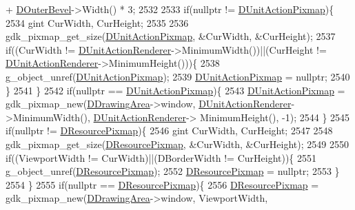 \begin{DoxyCode}
{       + \hyperlink{classCApplicationData_abc2b04aa05148da81145ff6d6bc2bf01}{DOuterBevel}->Width() * 3;
2532     
2533     \textcolor{keywordflow}{if}(\textcolor{keyword}{nullptr} != \hyperlink{classCApplicationData_ae264356c833cd581093e3b373cce6620}{DUnitActionPixmap})\{
2534         gint CurWidth, CurHeight;
2535         
2536         gdk\_pixmap\_get\_size(\hyperlink{classCApplicationData_ae264356c833cd581093e3b373cce6620}{DUnitActionPixmap}, &CurWidth, &CurHeight);
2537         \textcolor{keywordflow}{if}((CurWidth != \hyperlink{classCApplicationData_a5aca1f832dd6387662f0d4441745cf6f}{DUnitActionRenderer}->MinimumWidth())||(CurHeight != 
      \hyperlink{classCApplicationData_a5aca1f832dd6387662f0d4441745cf6f}{DUnitActionRenderer}->MinimumHeight()))\{
2538             g\_object\_unref(\hyperlink{classCApplicationData_ae264356c833cd581093e3b373cce6620}{DUnitActionPixmap});
2539             \hyperlink{classCApplicationData_ae264356c833cd581093e3b373cce6620}{DUnitActionPixmap} = \textcolor{keyword}{nullptr};
2540         \}
2541     \}
2542     \textcolor{keywordflow}{if}(\textcolor{keyword}{nullptr} == \hyperlink{classCApplicationData_ae264356c833cd581093e3b373cce6620}{DUnitActionPixmap})\{
2543         \hyperlink{classCApplicationData_ae264356c833cd581093e3b373cce6620}{DUnitActionPixmap} = gdk\_pixmap\_new(\hyperlink{classCApplicationData_a4735f5d31632313e0b2a1659eb178987}{DDrawingArea}->window, 
      \hyperlink{classCApplicationData_a5aca1f832dd6387662f0d4441745cf6f}{DUnitActionRenderer}->MinimumWidth(), \hyperlink{classCApplicationData_a5aca1f832dd6387662f0d4441745cf6f}{DUnitActionRenderer}->
      MinimumHeight(), -1);
2544     \}
2545     \textcolor{keywordflow}{if}(\textcolor{keyword}{nullptr} != \hyperlink{classCApplicationData_aa9faf270fb2d769855fa5d787a883a83}{DResourcePixmap})\{
2546         gint CurWidth, CurHeight;
2547         
2548         gdk\_pixmap\_get\_size(\hyperlink{classCApplicationData_aa9faf270fb2d769855fa5d787a883a83}{DResourcePixmap}, &CurWidth, &CurHeight); 
2549         
2550         \textcolor{keywordflow}{if}((ViewportWidth != CurWidth)||(DBorderWidth != CurHeight))\{
2551             g\_object\_unref(\hyperlink{classCApplicationData_aa9faf270fb2d769855fa5d787a883a83}{DResourcePixmap});
2552             \hyperlink{classCApplicationData_aa9faf270fb2d769855fa5d787a883a83}{DResourcePixmap} = \textcolor{keyword}{nullptr};
2553         \}  
2554     \}
2555     \textcolor{keywordflow}{if}(\textcolor{keyword}{nullptr} == \hyperlink{classCApplicationData_aa9faf270fb2d769855fa5d787a883a83}{DResourcePixmap})\{
2556         \hyperlink{classCApplicationData_aa9faf270fb2d769855fa5d787a883a83}{DResourcePixmap} = gdk\_pixmap\_new(\hyperlink{classCApplicationData_a4735f5d31632313e0b2a1659eb178987}{DDrawingArea}->window, ViewportWidth, 
}
\end{DoxyCode}
